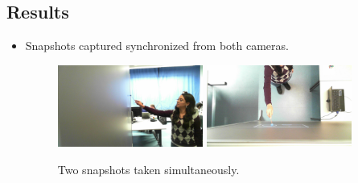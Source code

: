 \documentclass[a4paper,12pt]{article}
\begin{document}
\subsection{Results}

\begin{itemize}
\item Snapshots captured synchronized from both cameras. 
\begin{figure}[H]
    \begin{center}
	\includegraphics[width=0.45\textwidth]{FrameSide}
	\includegraphics[width=0.45\textwidth]{FrameUp}
	\caption{Two snapshots taken simultaneously.}

	\label{fig:video}
    \end{center}
\end{figure}


\end{itemize}
\end{document}
